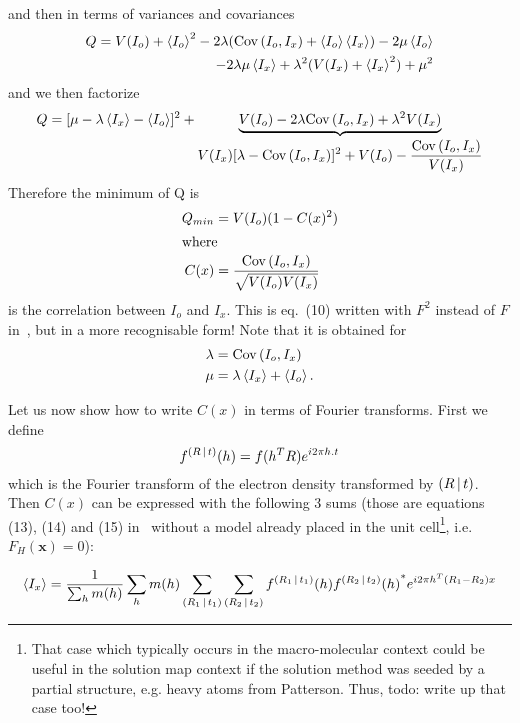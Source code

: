 \documentclass[11pt]{article}
\begin{document}
and then in terms of variances and covariances
\begin{equation*}
\begin{split}
Q = V(I_o) + \left\langle I_o \right\rangle^2 -2\lambda(\mathrm{Cov}\left(I_o,I_x\right) + \left\langle I_o \right\rangle\left\langle I_x \right\rangle) -2\mu\left\langle I_o \right\rangle
\\
-2\lambda\mu \left\langle I_x \right\rangle + \lambda^2(V(I_x) + \left\langle I_x \right\rangle^2) + \mu^2
\end{split}
\end{equation*}
and we then factorize
\begin{equation*}
Q = [\mu - \lambda \left\langle I_x \right\rangle - \left\langle I_o \right\rangle]^2 + \underbrace{V(I_o) - 2\lambda\mathrm{Cov}\left(I_o,I_x\right) + \lambda^2V(I_x)}_{\displaystyle V(I_x)[\lambda - \mathrm{Cov}\left(I_o,I_x\right)]^2 + V(I_o) - \frac{\mathrm{Cov}\left(I_o,I_x\right)}{V(I_x)}}
\end{equation*}
Therefore the minimum of Q is
\begin{align}
Q_{min} &= V(I_o)(1-C(x)^2)\\
\intertext{where}
C(x) &= \frac{\mathrm{Cov}\left(I_o,I_x\right)}{\sqrt{V(I_o)V(I_x)}}
\end{align}
is the correlation between $I_o$ and $I_x$. This is eq.~(10) written with $F^2$ instead of $F$ in~\cite{J.Navaza:1995}, but in a more recognisable form! Note that it is obtained for
\begin{align}
\lambda &= \mathrm{Cov}\left(I_o,I_x\right)\\
\mu &= \lambda\left\langle I_x \right\rangle + \left\langle I_o \right\rangle. 
\end{align}

Let us now show how to write $C(x)$ in terms of Fourier transforms. First we define
\begin{equation}
f^{\left( R\,\vert\, t \right)}(h) = f(h^T R) e^{i2\pi h.t}
\end{equation}
which is the Fourier transform of the electron density transformed by $\left( R\,\vert\, t \right)$.
Then $C(x)$ can be expressed with the following 3 sums (those are equations (13), (14) and (15) in~\cite{J.Navaza:1995} without a model already placed in the unit cell\footnote{That case which typically occurs in the macro-molecular context could be useful in the solution map context if the solution method was seeded by a partial structure, e.g. heavy atoms from Patterson. Thus, todo: write up that case too!}, i.e. $F_H(\mathbf{x}) = 0$):

\begin{equation}
\left\langle I_x \right\rangle = \frac{1}{\sum_h m(h)}\sum_h m(h) \sum_{\left( R_1\,\vert\, t_1 \right)} \sum_{\left( R_2\,\vert\, t_2 \right)} f^{\left( R_1\,\vert\, t_1 \right)}(h) {f^{\left( R_2\,\vert\, t_2 \right)}(h)}^* e^{i2\pi h^T (R_1 - R_2)x} 
\label{eqn:meanIx}
\end{equation}
\end{document}
